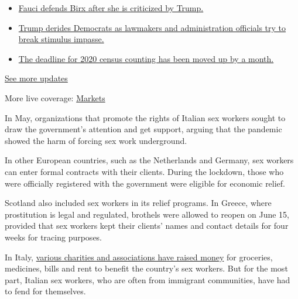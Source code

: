 \begin{itemize}
\tightlist
\item
  \href{https://www.nytimes.com/2020/08/03/world/coronavirus-covid-19.html?action=click\&pgtype=Article\&state=default\&region=MAIN_CONTENT_1\&context=storylines_live_updates\#link-4547638f}{Fauci
  defends Birx after she is criticized by Trump.}
\item
  \href{https://www.nytimes.com/2020/08/03/world/coronavirus-covid-19.html?action=click\&pgtype=Article\&state=default\&region=MAIN_CONTENT_1\&context=storylines_live_updates\#link-15e7f995}{Trump
  derides Democrats as lawmakers and administration officials try to
  break stimulus impasse.}
\item
  \href{https://www.nytimes.com/2020/08/03/world/coronavirus-covid-19.html?action=click\&pgtype=Article\&state=default\&region=MAIN_CONTENT_1\&context=storylines_live_updates\#link-e5a2cda}{The
  deadline for 2020 census counting has been moved up by a month.}
\end{itemize}

\href{https://www.nytimes.com/2020/08/03/world/coronavirus-covid-19.html?action=click\&pgtype=Article\&state=default\&region=MAIN_CONTENT_1\&context=storylines_live_updates}{See
more updates}

More live coverage:
\href{https://www.nytimes.com/live/2020/08/03/business/stock-market-today-coronavirus?action=click\&pgtype=Article\&state=default\&region=MAIN_CONTENT_1\&context=storylines_live_updates}{Markets}

In May, organizations that promote the rights of Italian sex workers
sought to draw the government's attention and get support, arguing that
the pandemic showed the harm of forcing sex work underground.

In other European countries, such as the Netherlands and Germany, sex
workers can enter formal contracts with their clients. During the
lockdown, those who were officially registered with the government were
eligible for economic relief.

Scotland also included sex workers in its relief programs. In Greece,
where prostitution is legal and regulated, brothels were allowed to
reopen on June 15, provided that sex workers kept their clients' names
and contact details for four weeks for tracing purposes.

In Italy,
\href{https://www.produzionidalbasso.com/project/covid19-nessuna-da-sola-solidarieta-immediata-alle-lavoratrici-sessuali-piu-colpite-dall-emergenza/}{various
charities and associations have raised money} for groceries, medicines,
bills and rent to benefit the country's sex workers. But for the most
part, Italian sex workers, who are often from immigrant communities,
have had to fend for themselves.

